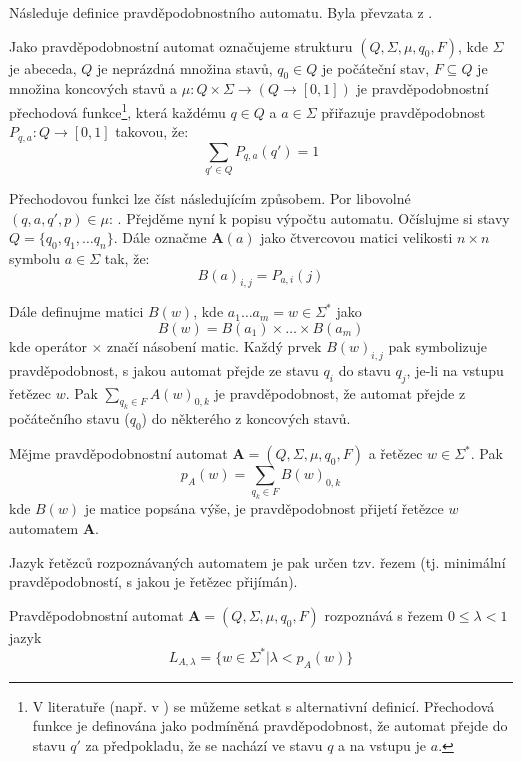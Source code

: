\documentclass[a4paper,10pt]{article}
\begin{document}
Následuje definice pravděpodobnostního automatu. Byla převzata z \cite{Rab-ProbAut}.
\begin{definition}
 Jako pravděpodobnostní automat označujeme strukturu $(Q, \Sigma, \mu, q_0, F)$, kde $\Sigma$ je abeceda, $Q$ je neprázdná množina stavů, $q_0 \in Q$ je počáteční stav, $F \subseteq Q$ je množina koncových stavů a $\mu: Q \times \Sigma \rightarrow (Q \rightarrow [0,1])$ je pravděpodobnostní přechodová funkce\footnote{V literatuře (např. v \cite{San-ReaFuzLanProMaxMaxAut}) se můžeme setkat s alternativní definicí. Přechodová funkce je definována jako podmíněná pravděpodobnost, že automat přejde do stavu $q'$ za předpokladu, že se nachází ve stavu $q$ a na vstupu je $a$.}, která každému $q \in Q$ a $a \in \Sigma$ přiřazuje pravděpodobnost $P_{q,a}: Q \rightarrow [0,1]$ takovou, že:
 $$   
  \sum_{q' \in Q} P_{q, a}(q') = 1 
 $$
\end{definition}

Přechodovou funkci lze číst následujícím způsobem. Por libovolné $(q, a, q', p) \in \mu$: . Přejděme nyní k popisu výpočtu automatu. Očíslujme si stavy $Q = \{ q_0, q_1, \dots q_n \}$. Dále označme $\mathbf{A}(a)$ jako čtvercovou matici velikosti $n \times n$ symbolu $a \in \Sigma$ tak, že:
$$
  B(a)_{i, j} = P_{a,i}(j)
$$

Dále definujme matici $B(w)$, kde $a_1 \dots a_m = w \in \Sigma^*$ jako
$$
  B(w) = B(a_1) \times \dots \times B(a_m)
$$
kde operátor $\times$ značí násobení matic. Každý prvek $B(w)_{i,j}$ pak symbolizuje pravděpodobnost, s jakou automat přejde ze stavu $q_i$ do stavu $q_j$, je-li na vstupu řetězec $w$. Pak $\sum_{q_k \in F} A(w)_{0, k}$ je pravděpodobnost, že automat přejde z počátečního stavu ($q_0$) do některého z koncových stavů.

\begin{definition}
 Mějme pravděpodobnostní automat $\mathbf{A} = (Q, \Sigma, \mu, q_0, F)$ a řetězec $w \in \Sigma^*$. Pak 
 $$
  p_A(w) = \sum_{q_k \in F} B(w)_{0, k}
 $$ 
 kde $B(w)$ je matice popsána výše, je pravděpodobnost přijetí řetězce $w$ automatem $\mathbf{A}$.
\end{definition}

Jazyk řetězců rozpoznávaných automatem je pak určen tzv. řezem (tj. minimální pravděpodobností, s jakou je řetězec přijímán).
\begin{definition}
 Pravděpodobnostní automat $\mathbf{A} = (Q, \Sigma, \mu, q_0, F)$ rozpoznává s řezem $0 \leq \lambda < 1$ jazyk
 $$
  L_{A,\lambda} = \{ w \in \Sigma^* | \lambda < p_A(w) \}
 $$
\end{definition}
\end{document}

